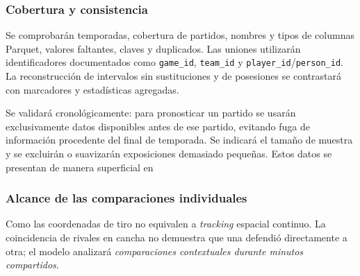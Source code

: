 \subsubsection{Cobertura y consistencia}
Se comprobarán temporadas, cobertura de partidos, nombres y tipos de columnas Parquet, valores faltantes, claves y duplicados. Las uniones utilizarán identificadores documentados como \texttt{game\_id}, \texttt{team\_id} y \texttt{player\_id}/\texttt{person\_id}. La reconstrucción de intervalos sin sustituciones y de posesiones se contrastará con marcadores y estadísticas agregadas.

Se validará cronológicamente: para pronosticar un partido se usarán exclusivamente datos disponibles antes de ese partido, evitando fuga de información procedente del final de temporada. Se indicará el tamaño de muestra y se excluirán o suavizarán exposiciones demasiado pequeñas.
Estos datos se presentan de manera superficial en \textbf{}
\subsubsection{Alcance de las comparaciones individuales}
Como las coordenadas de tiro no equivalen a \textit{tracking} espacial continuo. La coincidencia de rivales en cancha no demuestra que una defendió directamente a otra; el modelo analizará \emph{comparaciones contextuales durante minutos compartidos}.